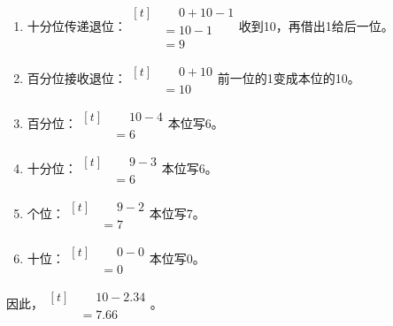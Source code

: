 {\begin{enumerate}[leftmargin=1.7em,itemsep=5pt,topsep=0pt]
\item 十分位传递退位：\(\begin{aligned}[t]&\phantom{={}}0+10-1\\&=10-1\\&=9\end{aligned}\)\quad 收到10，再借出1给后一位。
\item 百分位接收退位：\(\begin{aligned}[t]&\phantom{={}}0+10\\&=10\end{aligned}\)\quad 前一位的1变成本位的10。
\item 百分位：\(\begin{aligned}[t]&\phantom{={}}10-4\\&=6\end{aligned}\)\quad 本位写6。
\item 十分位：\(\begin{aligned}[t]&\phantom{={}}9-3\\&=6\end{aligned}\)\quad 本位写6。
\item 个位：\(\begin{aligned}[t]&\phantom{={}}9-2\\&=7\end{aligned}\)\quad 本位写7。
\item 十位：\(\begin{aligned}[t]&\phantom{={}}0-0\\&=0\end{aligned}\)\quad 本位写0。
\end{enumerate}
\par\smallskip
因此，\(\begin{aligned}[t]&\phantom{={}}10-2.34\\&=7.66\end{aligned}\)。
\par\medskip

}
